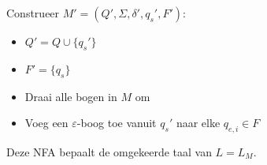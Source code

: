\documentclass[../aanvullingen_cursus.tex]{subfiles}
\begin{document}
Construeer \(M'=(Q',\Sigma,\delta',q_s',F')\):

\begin{itemize}
	\item \( Q'=Q\cup\{q_s'\} \)
	\item \( F'=\{q_s\} \)
	\item Draai alle bogen in \(M\) om
	\item Voeg een \( \varepsilon \)-boog toe vanuit \( q_s' \) naar elke \(q_{e,i} \in F\)
\end{itemize}

Deze NFA bepaalt de omgekeerde taal van \(L=L_M\).
\end{document}
